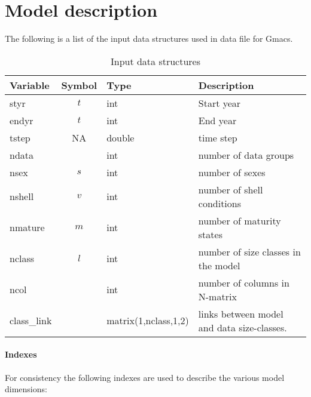 \section*{Model description}
The following is a list of the input data structures used in data file for Gmacs.

\begin{table}[!tbh]
	\caption{Input data structures}\label{Tab:inputDataStructures}
	\begin{tabular}{lcll}
	\hline
	Variable & Symbol & Type & Description \\
	\hline
	styr & $t$      & int  & Start year  \\
	endyr & $t$     & int  & End year    \\
	tstep & NA    & double & time step \\
	ndata &  &  int        & number of data groups \\
	nsex  & $s$   & int    & number of sexes \\
	nshell & $v$  & int    & number of shell conditions\\
	nmature & $m$ & int    & number of maturity states \\
	nclass & $l$ & int & number of size classes in the model\\
	ncol & & int & number of columns in N-matrix \\


	class\_link & & matrix(1,nclass,1,2)&links between model and data size-classes.\\
	\hline         
	\end{tabular}
\end{table}


\paragraph{Indexes}
For consistency the following indexes are used to describe the various model dimensions:

